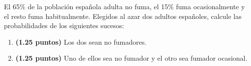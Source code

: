 
El 65\% de la población española adulta no fuma, el 15\% fuma ocasionalmente y el resto fuma habitualmente. Elegidos al azar dos adultos españoles, calcule las probabilidades de los siguientes sucesos:
\begin{enumerate}[label=\alph*)]
\item \textbf{(1.25 puntos)} Los dos sean no fumadores.
\item \textbf{(1.25 puntos)} Uno de ellos sea no fumador y el otro sea fumador ocasional.
\end{enumerate}

